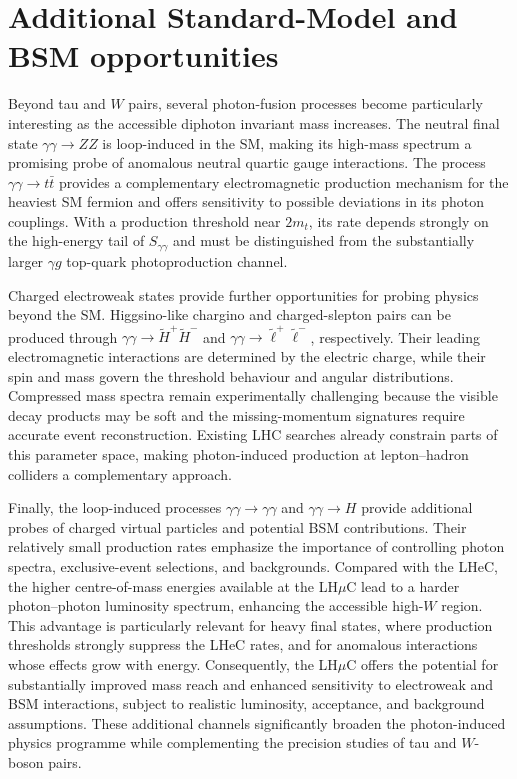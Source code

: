 \documentclass[11pt,a4paper]{article}
\newcommand{\sgg}{S_{\gamma\gamma}}
\begin{document}
\section{Additional Standard-Model and BSM opportunities}

Beyond tau and $W$ pairs, several photon-fusion processes become
particularly interesting as the accessible diphoton invariant mass
increases. The neutral final state $\gamma\gamma\to ZZ$ is
loop-induced in the SM, making its high-mass spectrum a promising
probe of anomalous neutral quartic gauge interactions.
The process $\gamma\gamma\to t\bar t$ provides a complementary
electromagnetic production mechanism for the heaviest SM fermion
and offers sensitivity to possible deviations in its photon
couplings. With a production threshold near $2m_t$, its rate
depends strongly on the high-energy tail of $\sgg$ and must
be distinguished from the substantially larger
$\gamma g$ top-quark photoproduction channel.

Charged electroweak states provide further opportunities for
probing physics beyond the SM. Higgsino-like chargino and
charged-slepton pairs can be produced through
$\gamma\gamma\to\widetilde H^+\widetilde H^-$ and
$\gamma\gamma\to\widetilde\ell^+\widetilde\ell^-$,
respectively. Their leading electromagnetic interactions
are determined by the electric charge, while their spin and
mass govern the threshold behaviour and angular distributions.
Compressed mass spectra remain experimentally challenging
because the visible decay products may be soft and the
missing-momentum signatures require accurate event
reconstruction. Existing LHC searches already constrain
parts of this parameter space, making photon-induced
production at lepton--hadron colliders a complementary
approach.

Finally, the loop-induced processes
$\gamma\gamma\to\gamma\gamma$ and $\gamma\gamma\to H$
provide additional probes of charged virtual particles
and potential BSM contributions. Their relatively small
production rates emphasize the importance of controlling
photon spectra, exclusive-event selections, and backgrounds.
Compared with the LHeC, the higher centre-of-mass energies
available at the LH$\mu$C lead to a harder photon--photon
luminosity spectrum, enhancing the accessible high-$W$
region. This advantage is particularly relevant for heavy
final states, where production thresholds strongly suppress
the LHeC rates, and for anomalous interactions whose effects
grow with energy. Consequently, the LH$\mu$C offers the
potential for substantially improved mass reach and
enhanced sensitivity to electroweak and BSM interactions,
subject to realistic luminosity, acceptance, and background
assumptions. These additional channels significantly broaden
the photon-induced physics programme while complementing
the precision studies of tau and $W$-boson pairs.
\end{document}
